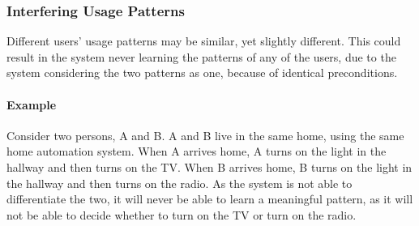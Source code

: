 \subsubsection{Interfering Usage Patterns}
Different users' usage patterns may be similar, yet slightly different. This could result in the system never learning the patterns of any of the users, due to the system considering the two patterns as one, because of identical preconditions.
\paragraph{Example}
Consider two persons, A and B. A and B live in the same home, using the same home automation system. When A arrives home, A turns on the light in the hallway and then turns on the TV. When B arrives home, B turns on the light in the hallway and then turns on the radio. As the system is not able to differentiate the two, it will never be able to learn a meaningful pattern, as it will not be able to decide whether to turn on the TV or turn on the radio.